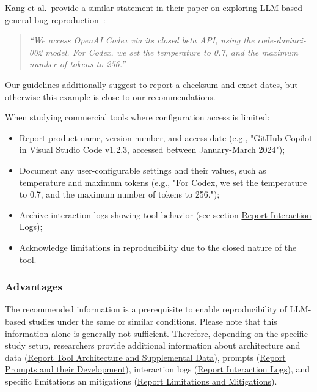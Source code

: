 Kang et al.~provide a similar statement in their paper on exploring LLM-based general bug reproduction~\cite{DBLP:conf/icse/KangYY23}:

\begin{quote}
\it
``We access OpenAI Codex via its closed beta API, using the code-davinci-002 model. For Codex, we set the temperature to 0.7, and the maximum number of tokens to 256.''
\end{quote}

Our guidelines additionally suggest to report a checksum and exact dates, but otherwise this example is close to our recommendations. 


When studying commercial tools where configuration access is limited: 
\begin{itemize}
\item Report product name, version number, and access date (e.g., "GitHub Copilot in Visual Studio Code v1.2.3, accessed between January-March 2024");
\item Document any user-configurable settings and their values, such as temperature and maximum tokens (e.g., "For Codex, we set the temperature to 0.7, and the maximum number of tokens to 256.");
\item Archive interaction logs showing tool behavior (see section \href{/guidelines/report-interaction-logs}{Report Interaction Logs});
\item Acknowledge limitations in reproducibility due to the closed nature of the tool. 
\end{itemize}


\subsubsection{Advantages}

The recommended information is a prerequisite to enable reproducibility of LLM-based studies under the same or similar conditions.
Please note that this information alone is generally not sufficient.
Therefore, depending on the specific study setup, researchers \should provide additional information about architecture and data (\href{/guidelines/#report-tool-architecture-and-supplemental-data}{Report Tool Architecture and Supplemental Data}), prompts (\href{/guidelines/#report-prompts-and-their-development}{Report Prompts and their Development}), interaction logs (\href{/guidelines//#report-interaction-logs}{Report Interaction Logs}), and specific limitations an mitigations (\href{/guidelines/#report-limitations-and-mitigations}{Report Limitations and Mitigations}).

